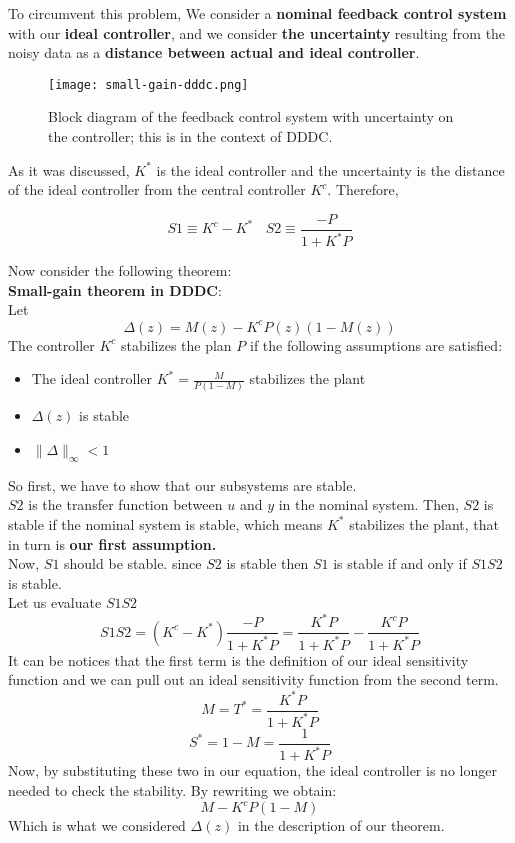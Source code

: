 To circumvent this problem, We consider a \textbf{nominal feedback control system} with our \textbf{ideal controller}, and we consider \textbf{the uncertainty} resulting from the noisy data as a \textbf{distance between actual and ideal controller}.\\

 \begin{figure}[H]
    \centering
    \texttt{[image: small-gain-dddc.png]}
    \caption{Block diagram of the feedback control system with uncertainty on the controller; this is in the context of DDDC.}
 \end{figure}

As it was discussed, $K^{*}$ is the ideal controller and the uncertainty is the distance of the ideal controller from the central controller $K^{c}$. Therefore,

\[
S1 \equiv K^{c} - K^{*} \:\:\:\: S2 \equiv \frac{-P}{1+K^{*}P} 
\]

Now consider the following theorem:\\

\textbf{Small-gain theorem in DDDC}:\\
Let
\[
\Delta(z) = M(z) - K^{c}P(z)(1-M(z))
\]
The controller $K^{c}$ stabilizes the plan $P$ if the following assumptions are satisfied:
\begin{itemize}
    \item The ideal controller $K^{*} = \frac{M}{P(1-M)}$ stabilizes the plant
    \item $\Delta(z)$ is stable
    \item $\|\Delta\|_\infty<1 $
\end{itemize}

So first, we have to show that our subsystems are stable.\\

$S2$ is the transfer function between $u$ and $y$ in the nominal system. Then, $S2$ is stable if the nominal system is stable, which means $K^{*}$ stabilizes the plant, that in turn is \textbf{our first assumption.}\\

Now, $S1$ should be stable. since $S2$ is stable then $S1$ is stable if and only if $S1S2$ is stable.\\


Let us evaluate $S1S2$
\[
S1S2 = (K^{c} - K^{*})\frac{-P}{1+K^{*}P} = \frac{K^{*}P}{1+K^{*}P} - \frac{K^{c}P}{1+K^{*}P} 
\]
It can be notices that the first term is the definition of our ideal sensitivity function and we can pull out an ideal sensitivity function from the second term.
\[
M = T^{*} = \frac{K^{*}P}{1+K^{*}P}
\]
\[
S^{*} = 1 - M = \frac{1}{1+ K^{*}P}
\]
Now, by substituting these two in our equation, the ideal controller is no longer needed to check the stability. By rewriting we obtain:
\[
M - K^{c}P(1-M)
\]
Which is what we considered $\Delta(z)$ in the description of our theorem.

